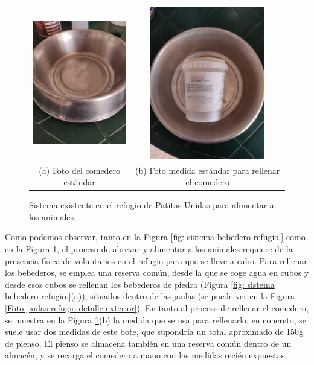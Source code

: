 \documentclass[12pt]{article}
\begin{document}
	\begin{figure}[h!]
		\begin{center}
			\begin{tabular}{cc}
				\includegraphics[width=50mm]{img/comedero_refugio_1.jpg} &   \includegraphics[width=50mm]{img/comedero_refugio_2.jpg} \\
				(a) Foto del comedero estándar & (b) Foto medida estándar para rellenar el comedero\\[6pt]
			\end{tabular}
			\caption{Sistema existente en el refugio de Patitas Unidas para alimentar a los animales. }
			\label{fig: sistema comedero refugio.}
		\end{center}
	\end{figure}

	\noindent Como podemos observar, tanto en la Figura \ref{fig: sistema bebedero refugio.} como en la Figura \ref{fig: sistema comedero refugio.}, el proceso de abrevar y alimentar a los animales requiere de la presencia física de voluntarios en el refugio para que se lleve a cabo. Para rellenar los bebederos, se emplea una reserva común, desde la que se coge agua en cubos y desde esos cubos se rellenan los bebederos de piedra (Figura \ref{fig: sistema bebedero refugio.}(a)), situados dentro de las jaulas (se puede ver en la Figura \ref{Foto jaulas refugio detalle exterior}). En tanto al proceso de rellenar el comedero, se muestra en la Figura \ref{fig: sistema comedero refugio.}(b) 
	la medida que se usa para rellenarlo, en concreto, se suele usar dos medidas de este bote, que supondría un total aproximado de 150g de pienso. El pienso se almacena también en una reserva común dentro de un almacén, y se recarga el comedero a mano con las medidas recién expuestas.
		
\end{document}
